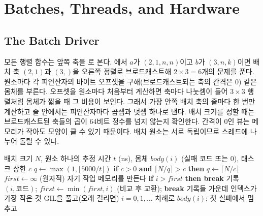 \section{Batches, Threads, and Hardware}
\label{sec:lu-batches}

\subsection{The Batch Driver}

모든 행렬 함수는 앞쪽 축을 로 본다. 에서 $a$가 $(2,1,n,n)$이고 $b$가 $(3,n,k)$이면 배치 축 $(2,1)$과 $(3,)$을 오른쪽 정렬로 브로드캐스트해 $2\times3=6$개의 문제를 푼다. 원소마다 각 피연산자의 바이트 오프셋을 구해(브로드캐스트되는 축의 간격은 $0$) 같은 몸체를 부른다. 오프셋을 원소마다 처음부터 계산하면 축마다 나눗셈이 들어 $3\times3$ 행렬처럼 몸체가 짧을 때 그 비용이 보인다. 그래서 가장 안쪽 배치 축의 줄마다 한 번만 계산하고 줄 안에서는 피연산자마다 곱셈과 덧셈 하나로 낸다. 배치 크기를 정할 때는 브로드캐스트된 축들의 곱이 64비트 정수를 넘지 않는지 확인한다. 간격이 $0$인 뷰는 메모리가 작아도 모양이 클 수 있기 때문이다. 배치 원소는 서로 독립이므로 스레드에 나누어 돌릴 수 있다.

\begin{algorithm}[htbp]
\begin{algorithmic}[1]
\Require 배치 크기 $N$, 원소 하나의 추정 시간 $t$ (ns), 몸체 $\mathit{body}(i)$ (실패 코드 또는 $0$), 태스크 상한 $c$
  \State $q\gets\max(1,\lfloor5000/t\rfloor)$ 
  \State \textbf{if} $c>0$ \textbf{and} $\lceil N/q\rceil>c$ \textbf{then} $q\gets\lceil N/c\rceil$
  \State $\mathit{first}\gets\infty$ (원자적)
    \State 자기 작업 메모리를 만든다
      \State \textbf{if} $i>\mathit{first}$ \textbf{then break} 
        \State 기록 $(i,\text{코드})$; $\mathit{first}\gets\min(\mathit{first},i)$ (비교 후 교환); \textbf{break}
      \EndIf
    \EndFor
  \EndFor
  \State \Return 기록들 가운데 인덱스가 가장 작은 것
\Else
  \State GIL을 풀고(오래 걸리면) $i=0,1,\dots$ 차례로 $\mathit{body}(i)$; 첫 실패에서 멈추고 \Return
\EndIf
\end{algorithmic}
\caption{배치 드라이버 ()}
\label{alg:lu-batch}
\end{algorithm}

